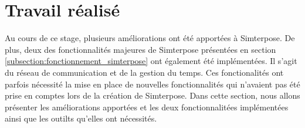 \section{Travail réalisé}
\label{section:work}
Au cours de ce stage, plusieurs améliorations ont été apportées à Simterpose. De plus, deux des fonctionnalités majeures de Simterpose présentées en section \ref{subsection:fonctionnement_simterpose} ont également été implémentées. Il s'agit du réseau de communication et de la gestion du temps. Ces fonctionalités ont parfois nécessité la mise en place de nouvelles fonctionnalités qui n'avaient pas été prise en comptes lors de la création de Simterpose. Dans cette section, nous allons présenter les améliorations apportées et les deux fonctionnalitées implémentées ainsi que les outilts qu'elles ont nécessités.



